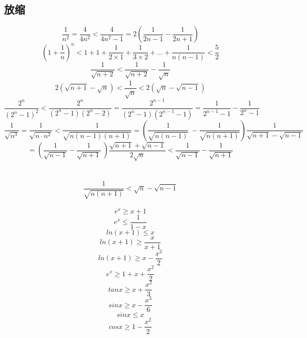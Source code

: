 \documentclass[UTF8]{ctexart}
\begin{document}
		\subsection{放缩}
			\[\frac{1}{n^2}=\frac{4}{4n^2}<\frac{4}{4n^2 -1}=2\left(\frac{1}{2n-1}-\frac{1}{2n+1}\right)\]
			\[\left(1+\frac{1}{n}\right)^n<1+1+\frac{1}{2\times 1}+\frac{1}{3\times 2}+\dots+\frac{1}{n(n-1)}<\frac{5}{2}\]
			\[\frac{1}{\sqrt{n+2}}<\frac{1}{\sqrt{n+2}}-\frac{1}{\sqrt{n}}\]
			\[2(\sqrt{n+1}-\sqrt{n})<\frac{1}{\sqrt{n}}<2(\sqrt{n}-\sqrt{n-1})\]
			\[\frac{2^n}{(2^n-1)^2}<\frac{2^n}{(2^n-1)(2^n-2)}=\frac{2^{n-1}}{(2^n-1)(2^{n-1}-1)}=\frac{1}{2^{n-1}-1}-\frac{1}{2^n-1}\]
			\[\frac{1}{\sqrt{n^3}}=\frac{1}{\sqrt{n\cdot n^2}}<\frac{1}{\sqrt{n(n-1)(n+1)}}=\left(\frac{1}{\sqrt{n(n-1)}}\
				-\frac{1}{\sqrt{n(n+1)}}\right)\frac{1}{\sqrt{n+1}-\sqrt{n-1}}\]
				\[=\left(\frac{1}{\sqrt{n-1}}-\frac{1}{\sqrt{n+1}}\
				\right)\frac{\sqrt{n+1}+\sqrt{n-1}}{2\sqrt{n}}<\frac{1}{\sqrt{n-1}}-\frac{1}{\sqrt{n+1}}\]
			\\
			\\
			\[\frac{1}{\sqrt{n(n+1)}}<\sqrt{n}-\sqrt{n-1}\]
			\\
			\[e^x\geq x+1\]
			\[e^x\leq \frac{1}{1-x}\]
			\[ln(x+1)\leq x\]
			\[ln(x+1)\geq \frac{x}{x+1}\]
			\[ln(x+1)\geq x-\frac{x^2}{2}\]
			\[e^x\geq 1+x+\frac{x^2}{2}\]
			\[tanx\geq x+\frac{x^2}{3}\]
			\[sinx\geq x-\frac{x^3}{6}\]
			\[sinx\leq x\]
			\[cosx\geq 1-\frac{x^2}{2}\]
\end{document}
